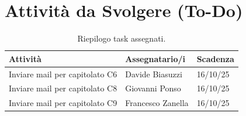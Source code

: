 \documentclass[a4paper, 11pt, oneside]{scrartcl} %
\begin{document}
\section{Attività da Svolgere (To-Do)}

\begin{table}[h!]
\centering
\begin{tabular}{@{}lll@{}}
\toprule
\textbf{Attività} & \textbf{Assegnatario/i} & \textbf{Scadenza} \\
\midrule
Inviare mail per capitolato C6 & Davide Biasuzzi & 16/10/25 \\
Inviare mail per capitolato C8 & Giovanni Ponso & 16/10/25 \\
Inviare mail per capitolato C9 & Francesco Zanella & 16/10/25 \\
\bottomrule
\end{tabular}
\caption{Riepilogo task assegnati.}
\end{table}
\end{document}

